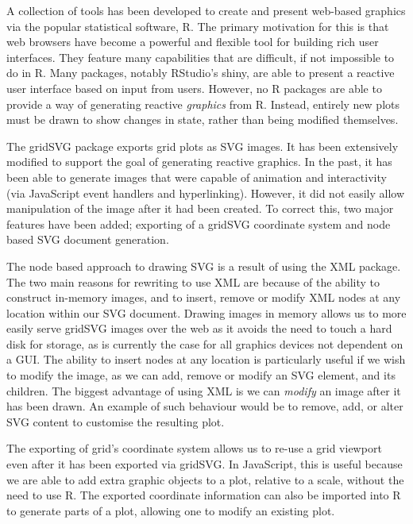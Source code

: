 \documentclass[11pt, a4paper]{article}
\title{\doctitle{}}
\author{\docauthor{} \\ \url{simon.potter@auckland.ac.nz}}
\date{\docdate{}}
\newcommand{\grid}{\textsf{grid}}
\newcommand{\R}{\textsf{R}}
\newcommand{\gridSVG}{\textsf{gridSVG}}
\newcommand{\JS}{\textsf{JavaScript}}
\newcommand{\pkg}[1]{\textsf{#1}}
\newcommand{\tsc}[1]{{\small \textsc{#1}}}
\begin{document}
\maketitle

A collection of tools has been developed to create and present
web-based graphics via the popular statistical software, \R{}. The
primary motivation for this is that web browsers have become a
powerful and flexible tool for building rich user interfaces. They
feature many capabilities that are difficult, if not impossible to do
in \R{}. Many packages, notably RStudio's \pkg{shiny}, are able to
present a reactive user interface based on input from users. However,
no \R{} packages are able to provide a way of generating reactive
\emph{graphics} from \R{}. Instead, entirely new plots must be drawn
to show changes in state, rather than being modified themselves.

The \gridSVG{} package exports \pkg{grid} plots as \tsc{SVG}
images. It has been extensively modified to support the goal of
generating reactive graphics. In the past, it has been able to
generate images that were capable of animation and interactivity (via
\JS{} event handlers and hyperlinking). However, it did not easily
allow manipulation of the image after it had been created. To correct
this, two major features have been added; exporting of a \gridSVG{}
coordinate system and node based \tsc{SVG} document generation.

The node based approach to drawing \tsc{SVG} is a result of using the
\pkg{XML} package. The two main reasons for rewriting to use \pkg{XML}
are because of the ability to construct in-memory images, and to
insert, remove or modify \tsc{XML} nodes at any location within our
\tsc{SVG} document. Drawing images in memory allows us to more easily
serve \gridSVG{} images over the web as it avoids the need to touch a
hard disk for storage, as is currently the case for all graphics
devices not dependent on a GUI. The ability to insert nodes at any
location is particularly useful if we wish to modify the image, as we
can add, remove or modify an \tsc{SVG} element, and its children. The
biggest advantage of using \pkg{XML} is we can \emph{modify} an image
after it has been drawn. An example of such behaviour would be to
remove, add, or alter \tsc{SVG} content to customise the resulting
plot.

The exporting of \grid{}'s coordinate system allows us to re-use a
\grid{} viewport even after it has been exported via \gridSVG{}. In
\JS{}, this is useful because we are able to add extra graphic objects
to a plot, relative to a scale, without the need to use \R{}. The
exported coordinate information can also be imported into \R{} to
generate parts of a plot, allowing one to modify an existing plot.
\end{document}
